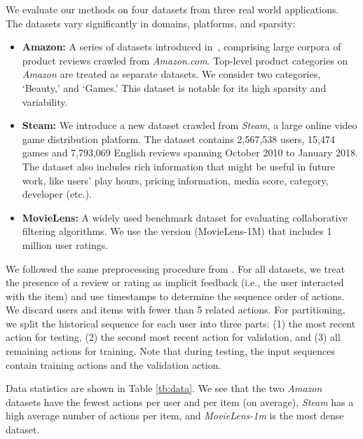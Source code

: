 \documentclass[conference]{IEEEtran}
\begin{document}
We evaluate our methods on four datasets from three real world applications. The datasets 
vary
significantly in domains, platforms, and sparsity: 
\begin{itemize}
\item \textbf{Amazon:} A series of datasets introduced in~\cite{VisualSIGIR}, comprising large corpora of product reviews crawled from \emph{Amazon.com}. Top-level product categories on \emph{Amazon} are treated as separate datasets. We consider two categories, `Beauty,' and `Games.' This dataset is notable for its high sparsity and variability.
\item \textbf{Steam:} We introduce a new dataset crawled from \emph{Steam}, a large online video game distribution platform. The dataset contains 2,567,538 users, 15,474 games and 7,793,069 English reviews spanning October 2010 to January 2018. The dataset also includes rich information that might be useful in future work, like 
users'
play hours, pricing information, media score, category, developer (etc.).
\item \textbf{MovieLens:} A widely used benchmark dataset for evaluating collaborative filtering algorithms. We use the version (MovieLens-1M) that includes 1 million user ratings.
\end{itemize}

We followed the same preprocessing procedure from \cite{DBLP:conf/recsys/HeKM17,DBLP:conf/icdm/HeM16,rendle2010fpmc}. For all datasets, we treat the presence of a review or rating as implicit feedback (i.e., the user interacted with the item) and use timestamps to determine the sequence order of actions. We discard users and items with fewer than 5 related actions. For partitioning, we split the historical sequence  for each user  into three parts: (1) the most recent action  for testing, (2) the second most recent action  for validation, and (3) all remaining actions for training. Note that during testing, the input sequences contain training actions and the validation action.

Data statistics are shown in Table \ref{tb:data}.
We 
see that the two \emph{Amazon} datasets have the 
fewest
actions per user and per item (on average), \emph{Steam} has a high average number of actions per item, and \emph{MovieLens-1m} is the most dense dataset.
\end{document}
